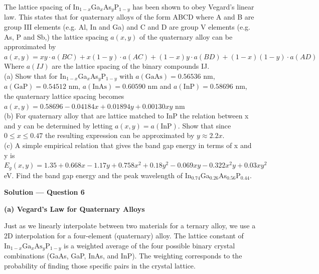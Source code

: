 \begin{question}[Question 6]
The lattice spacing of In$_{1-x}$Ga$_x$As$_y$P$_{1-y}$ has been shown to obey Vegard's linear law. This states that for quaternary alloys of the form ABCD where A and B are group III elements (e.g. Al, In and Ga) and C and D are group V elements (e.g. As, P and Sb,) the lattice spacing $a(x,y)$ of the quaternary alloy can be approximated by $a(x,y) = x y \cdot a(BC) + x(1-y) \cdot a(AC) + (1-x)y \cdot a(BD) + (1-x)(1-y) \cdot a(AD)$ Where $a(IJ)$ are the lattice spacing of the binary compounds IJ.\\
(a) Show that for In$_{1-x}$Ga$_x$As$_y$P$_{1-y}$ with $a(\text{GaAs}) = 0.56536$ nm, $a(\text{GaP}) = 0.54512$ nm, $a(\text{InAs}) = 0.60590$ nm and $a(\text{InP}) = 0.58696$ nm, the quaternary lattice spacing becomes $a(x,y) = 0.58696 - 0.04184x + 0.01894y + 0.00130xy$ nm\\
(b) For quaternary alloy that are lattice matched to InP the relation between x and y can be determined by letting $a(x,y) = a(\text{InP})$. Show that since $0 \le x \le 0.47$ the resulting expression can be approximated by $y \approx 2.2x$.\\
(c) A simple empirical relation that gives the band gap energy in terms of x and y is $E_g(x,y) = 1.35 + 0.668x - 1.17y + 0.758x^2 + 0.18y^2 - 0.069xy - 0.322x^2y + 0.03xy^2$ eV. Find the band gap energy and the peak wavelength of In$_{0.74}$Ga$_{0.26}$As$_{0.56}$P$_{0.44}$.
\end{question}

\textbf{\large Solution --- Question 6}

\textbf{(a) Vegard's Law for Quaternary Alloys}

Just as we linearly interpolate between two materials for a ternary alloy, we use a 2D interpolation for a four-element (quaternary) alloy. The lattice constant of $\text{In}_{1-x}\text{Ga}_x\text{As}_y\text{P}_{1-y}$ is a weighted average of the four possible binary crystal combinations (GaAs, GaP, InAs, and InP). The weighting corresponds to the probability of finding those specific pairs in the crystal lattice.

